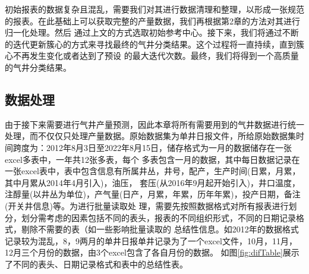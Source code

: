 初始报表的数据复杂且混乱，需要我们对其进行数据清理和整理，以形成一张规范的报表。在此基础上可以获取完整的产量数据，我们再根据第2章的方法对其进行归一化处理。然后
通过上文的方式选取初始参考中心。接下来，我们将通过不断的迭代更新簇心的方式来寻找最终的气井分类结果。这个过程将一直持续，直到簇心不再发生变化或者达到了预设
的最大迭代次数。最终，我们将得到一个高质量的气井分类结果。
\subsection{数据处理}
\label{cha:data}
由于接下来需要进行气井产量预测，因此本章将所有需要用到的气井数据进行统一处理，而不仅仅只处理产量数据。原始数据集为单井日报文件，所给原始数据集时间跨度为：2012年8月3日至2022年8月15日，储存格式为一月的数据储存在一张excel多表中，一年共12张多表，每个
多表包含一月的数据，其中每日数据记录在一张excel表中，表中包含信息有所属井丛，井号，配产，生产时间(日累，月累，其中月累从2014年4月引入)，油压，
套压(从2016年9月起开始引入)，井口温度，注醇量(以井丛为单位)，产气量(日产，月累，年累，历年年累)，投产日期，备注(开关井信息)等。为进行批量读取处
理，需要先按照数据格式对所有报表进行划分，划分需考虑的因素包括不同的表头，报表的不同组织形式，不同的日期记录格式，剔除不需要的表（如一些影响批量读取的
总结性信息。如2012年的数据格式记录较为混乱，8，9两月的单井日报单井记录为了一个excel文件，10月，11月，12月三个月份的数据，由3个excel包含了各自月份的数据。
如图\ref{fig:difTable}展示了不同的表头、日期记录格式和表中的总结性表。
